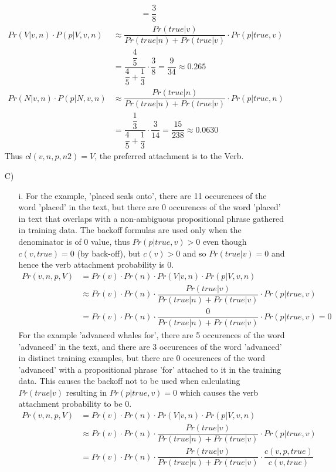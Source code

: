 \documentclass{article}
\begin{document}
\begin{enumerate}
\begin{align*}
& = \dfrac{3}{8}
\end{align*}
\begin{align*}
Pr(V|v,n) \cdot P(p|V,v,n) & \approx \dfrac{Pr(true|v)}{Pr(true|n) + Pr(true|v)} \cdot Pr(p|true,v) \\
& = \dfrac{\dfrac{4}{5}}{\dfrac{4}{5} + \dfrac{1}{3}} \cdot \dfrac{3}{8} = \dfrac{9}{34} \approx 0.265\\
Pr(N|v,n) \cdot P(p|N,v,n) & \approx \dfrac{Pr(true|n)}{Pr(true|n) + Pr(true|v)} \cdot Pr(p|true,n) \\
& = \dfrac{\dfrac{1}{3}}{\dfrac{4}{5} + \dfrac{1}{3}} \cdot \dfrac{3}{14} = \dfrac{15}{238} \approx 0.0630
\end{align*}
Thus $cl(v,n,p,n2)=V$, the preferred attachment is to the Verb.
\item[C)]
\begin{enumerate}
\item[i.] For the example, 'placed seals onto', there are 11 occurences of the word 'placed' in the text, but there are 0 occurences of the word 'placed' in text that overlaps with a non-ambiguous propositional phrase gathered in training data. The backoff formulas are used only when the denominator is of 0 value, thus $Pr(p|true,v)>0$ even though $c(v,true)=0$ (by back-off), but $c(v)>0$ and so $Pr(true|v)=0$ and hence the verb attachment probability is 0.
\begin{align*}
Pr(v,n,p,V) &=Pr(v) \cdot Pr(n) \cdot Pr(V|v,n) \cdot Pr(p|V,v,n) \\
&\approx Pr(v) \cdot Pr(n) \cdot \dfrac{Pr(true|v)}{Pr(true|n) + Pr(true|v)} \cdot Pr(p|true,v)\\
&=Pr(v) \cdot Pr(n) \cdot \dfrac{0}{Pr(true|n) + Pr(true|v)} \cdot Pr(p|true,v)=0
\end{align*}
For the example 'advanced whales for', there are 5 occurences of the word 'advanced' in the text, and there are 3 occurences of the word 'advanced' in distinct training examples, but there are 0 occurences of the word 'advanced' with a propositional phrase 'for' attached to it in the training data. This causes the backoff not to be used when calculating $Pr(true|v)$ resulting in $Pr(p|true,v)=0$ which causes the verb attachment probability to be 0. 
\begin{align*}
Pr(v,n,p,V) &=Pr(v) \cdot Pr(n) \cdot Pr(V|v,n) \cdot Pr(p|V,v,n) \\
&\approx Pr(v) \cdot Pr(n) \cdot \dfrac{Pr(true|v)}{Pr(true|n) + Pr(true|v)} \cdot Pr(p|true,v)\\
&=Pr(v) \cdot Pr(n) \cdot \dfrac{Pr(true|v)}{Pr(true|n) + Pr(true|v)} \cdot \dfrac{c(v,p,true)}{c(v,true)}\\

\end{align*}
\end{enumerate}
\end{enumerate}
\end{document}

